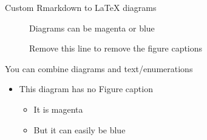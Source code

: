 \documentclass[aspectratio=169,11pt,handout,xcolor=dvipsnames]{beamer}
\providecommand{\tightlist}{}
\begin{document}
\begin{frame}{Custom Rmarkdown to LaTeX diagrams}
\label{custom-rmarkdown-to-latex-diagrams}
\vspace{1cm}

\begin{figure}
\centering
{}
\caption{Diagrams can be magenta or blue}
\label{fig:example_diagram_magenta}
\end{figure}

\begin{figure}
\centering
{}
\caption{Remove this line to remove the figure captions}
\label{fig:example_diagram_blue}
\end{figure}
\end{frame}

\begin{frame}{You can combine diagrams and text/enumerations}
\label{you-can-combine-diagrams-and-textenumerations}
\vspace{1cm}

\begin{figure}
\centering
{}
\label{fig:example_diagram_magenta}
\end{figure}
\begin{itemize}
\tightlist
\item
  This diagram has no Figure caption
  \begin{itemize}
  \tightlist
  \item
    It is magenta
  \item
    But it can easily be blue
  \end{itemize}
\end{itemize}
\end{frame}
\end{document}
